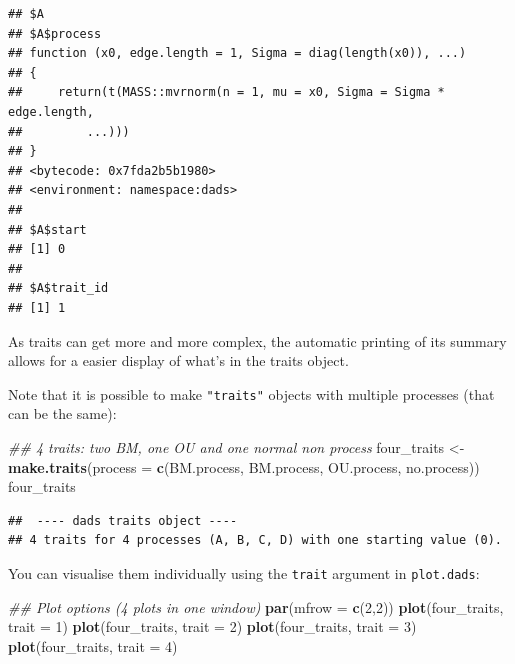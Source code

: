 \documentclass[]{book}
\newenvironment{Shaded}{\begin{snugshade}}{\end{snugshade}}
\newcommand{\CommentTok}[1]{\textcolor[rgb]{0.56,0.35,0.01}{\textit{#1}}}
\newcommand{\DataTypeTok}[1]{\textcolor[rgb]{0.13,0.29,0.53}{#1}}
\newcommand{\DecValTok}[1]{\textcolor[rgb]{0.00,0.00,0.81}{#1}}
\newcommand{\KeywordTok}[1]{\textcolor[rgb]{0.13,0.29,0.53}{\textbf{#1}}}
\newcommand{\NormalTok}[1]{#1}
\newcommand{\StringTok}[1]{\textcolor[rgb]{0.31,0.60,0.02}{#1}}
\begin{document}
\begin{verbatim}
## $A
## $A$process
## function (x0, edge.length = 1, Sigma = diag(length(x0)), ...) 
## {
##     return(t(MASS::mvrnorm(n = 1, mu = x0, Sigma = Sigma * edge.length, 
##         ...)))
## }
## <bytecode: 0x7fda2b5b1980>
## <environment: namespace:dads>
## 
## $A$start
## [1] 0
## 
## $A$trait_id
## [1] 1
\end{verbatim}

As traits can get more and more complex, the automatic printing of its summary allows for a easier display of what's in the traits object.

Note that it is possible to make \texttt{"traits"} objects with multiple processes (that can be the same):

\begin{Shaded}
\begin{Highlighting}[]
\CommentTok{## 4 traits: two BM, one OU and one normal non process}
\NormalTok{four_traits <-}\StringTok{ }\KeywordTok{make.traits}\NormalTok{(}\DataTypeTok{process =} \KeywordTok{c}\NormalTok{(BM.process,}
\NormalTok{                                       BM.process,}
\NormalTok{                                       OU.process,}
\NormalTok{                                       no.process))}
\NormalTok{four_traits}
\end{Highlighting}
\end{Shaded}

\begin{verbatim}
##  ---- dads traits object ---- 
## 4 traits for 4 processes (A, B, C, D) with one starting value (0).
\end{verbatim}

You can visualise them individually using the \texttt{trait} argument in \texttt{plot.dads}:

\begin{Shaded}
\begin{Highlighting}[]
\CommentTok{## Plot options (4 plots in one window)}
\KeywordTok{par}\NormalTok{(}\DataTypeTok{mfrow =} \KeywordTok{c}\NormalTok{(}\DecValTok{2}\NormalTok{,}\DecValTok{2}\NormalTok{))}
\KeywordTok{plot}\NormalTok{(four_traits, }\DataTypeTok{trait =} \DecValTok{1}\NormalTok{)}
\KeywordTok{plot}\NormalTok{(four_traits, }\DataTypeTok{trait =} \DecValTok{2}\NormalTok{)}
\KeywordTok{plot}\NormalTok{(four_traits, }\DataTypeTok{trait =} \DecValTok{3}\NormalTok{)}
\KeywordTok{plot}\NormalTok{(four_traits, }\DataTypeTok{trait =} \DecValTok{4}\NormalTok{)}
\end{Highlighting}
\end{Shaded}
\end{document}
